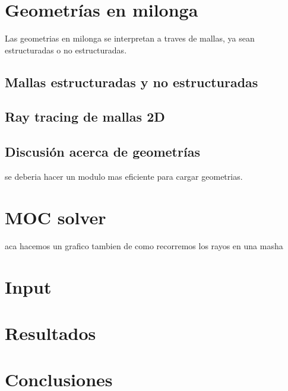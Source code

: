 \documentclass[11pt]{article}
\begin{document}
\section{Geometr\'ias en milonga}

Las geometrias en milonga se interpretan a traves de mallas, ya sean estructuradas o no estructuradas. 

\subsection{Mallas estructuradas y no estructuradas}

\subsection{Ray tracing de mallas 2D}

\subsection{Discusi\'on acerca de geometr\'ias}

se deberia hacer un modulo mas eficiente para cargar geometrias.

\section{MOC solver}
aca hacemos un grafico tambien de como recorremos los rayos en una masha

\section{Input}

\section{Resultados}

\section{Conclusiones}

\label{lastpage}

\printbibliography
\end{document}
